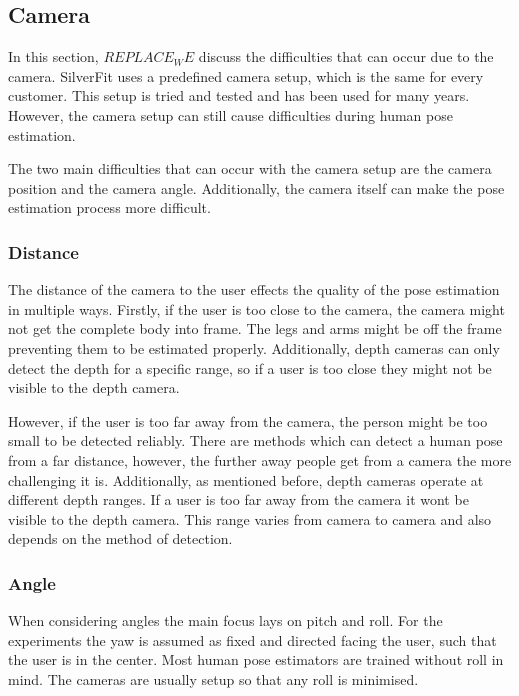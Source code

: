 \subsection{Camera}

In this section, $REPLACE_WE$ discuss the difficulties that can occur due to the camera. SilverFit uses a predefined camera setup, which is the same for every customer. This setup is tried and tested and has been used for many years. However, the camera setup can still cause difficulties during human pose estimation.

The two main difficulties that can occur with the camera setup are the camera position and the camera angle. Additionally, the camera itself can make the pose estimation process more difficult.

\subsubsection{Distance}

The distance of the camera to the user effects the quality of the pose estimation in multiple ways. Firstly, if the user is too close to the camera, the camera might not get the complete body into frame. The legs and arms might be off the frame preventing them to be estimated properly. Additionally, depth cameras can only detect the depth for a specific range, so if a user is too close they might not be visible to the depth camera.

However, if the user is too far away from the camera, the person might be too small to be detected reliably. There are methods which can detect a human pose from a far distance, however, the further away people get from a camera the more challenging it is. Additionally, as mentioned before, depth cameras operate at different depth ranges. If a user is too far away from the camera it wont be visible to the depth camera. This range varies from camera to camera and also depends on the method of detection.

\subsubsection{Angle}

When considering angles the main focus lays on pitch and roll. For the experiments the yaw is assumed as fixed and directed facing the user, such that the user is in the center. Most human pose estimators are trained without roll in mind. The cameras are usually setup so that any roll is minimised.

